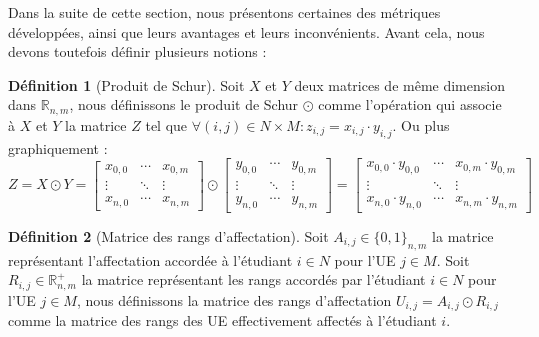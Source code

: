 \documentclass{rapport}
\theoremstyle{definition}
\newtheorem{definition}{Définition}
\theoremstyle{remark}
\theoremstyle{plain}
\theoremstyle{definition}
\theoremstyle{definition}
\theoremstyle{remark}
\theoremstyle{definition}
\begin{document}
Dans la suite de cette section, nous présentons certaines des métriques développées, ainsi que leurs avantages et leurs inconvénients.
Avant cela, nous devons toutefois définir plusieurs notions :

\begin{definition}[Produit de Schur]
    Soit $X$ et $Y$ deux matrices de même dimension dans $\mathbb{R}_{n,m}$, nous définissons le produit de Schur $\odot$
    comme l'opération qui associe à $X$ et $Y$ la matrice $Z$ tel que $\forall (i,j)\in N\times M:z_{i,j}=x_{i,j}\cdot y_{i,j}$. Ou plus graphiquement :
    $$
    Z = X\odot Y = \begin{bmatrix}
        x_{0,0} & \cdots & x_{0,m} \\
        \vdots & \ddots & \vdots \\
        x_{n,0} & \cdots & x_{n,m}
    \end{bmatrix} \odot \begin{bmatrix}
        y_{0,0} & \cdots & y_{0,m} \\
        \vdots & \ddots & \vdots \\
        y_{n,0} & \cdots & y_{n,m}
    \end{bmatrix} = \begin{bmatrix}
        x_{0,0}\cdot y_{0,0} & \cdots & x_{0,m}\cdot y_{0,m} \\
        \vdots & \ddots & \vdots \\
        x_{n,0}\cdot y_{n,0} & \cdots & x_{n,m}\cdot y_{n,m}
    \end{bmatrix}
    $$
\end{definition}

\begin{definition}[Matrice des rangs d'affectation]
    Soit $A_{i,j}\in\{0,1\}_{n,m}$ la matrice représentant l'affectation accordée à l'étudiant $i\in N$ pour l'UE $j\in M$.
    Soit $R_{i,j}\in\mathbb{R}^{+}_{n,m}$ la matrice représentant les rangs accordés par l'étudiant $i\in N$ pour l'UE $j\in M$, nous
    définissons la matrice des rangs d'affectation $U_{i,j} = A_{i,j} \odot R_{i,j}$ comme la matrice des rangs des UE effectivement affectés à l'étudiant $i$.
\end{definition}
\end{document}
